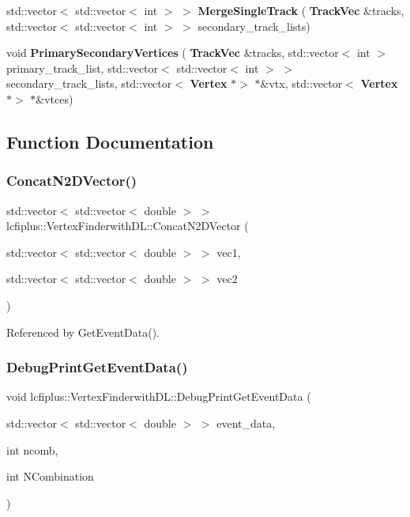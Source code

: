 \begin{DoxyCompactItemize}
\item 
std\+::vector$<$ std\+::vector$<$ int $>$ $>$ \textbf{ Merge\+Single\+Track} (\textbf{ Track\+Vec} \&tracks, std\+::vector$<$ std\+::vector$<$ int $>$ $>$ secondary\+\_\+track\+\_\+lists)
\item 
void \textbf{ Primary\+Secondary\+Vertices} (\textbf{ Track\+Vec} \&tracks, std\+::vector$<$ int $>$ primary\+\_\+track\+\_\+list, std\+::vector$<$ std\+::vector$<$ int $>$ $>$ secondary\+\_\+track\+\_\+lists, std\+::vector$<$ \textbf{ Vertex} $\ast$$>$ $\ast$\&vtx, std\+::vector$<$ \textbf{ Vertex} $\ast$$>$ $\ast$\&vtces)
\end{DoxyCompactItemize}


\subsection{Function Documentation}
\mbox{\label{namespacelcfiplus_1_1VertexFinderwithDL_a25ff5f93f960ee69e080216f132c5e1c}} 
\subsubsection{Concat\+N2\+D\+Vector()}
{\footnotesize\ttfamily std\+::vector$<$ std\+::vector$<$ double $>$ $>$ lcfiplus\+::\+Vertex\+Finderwith\+D\+L\+::\+Concat\+N2\+D\+Vector (\begin{DoxyParamCaption}\item[{std\+::vector$<$ std\+::vector$<$ double $>$ $>$}]{vec1,  }\item[{std\+::vector$<$ std\+::vector$<$ double $>$ $>$}]{vec2 }\end{DoxyParamCaption})}



Referenced by Get\+Event\+Data().

\mbox{\label{namespacelcfiplus_1_1VertexFinderwithDL_a172281350ea443c9eb5b63ac949cec10}} 
\subsubsection{Debug\+Print\+Get\+Event\+Data()}
{\footnotesize\ttfamily void lcfiplus\+::\+Vertex\+Finderwith\+D\+L\+::\+Debug\+Print\+Get\+Event\+Data (\begin{DoxyParamCaption}\item[{std\+::vector$<$ std\+::vector$<$ double $>$ $>$}]{event\+\_\+data,  }\item[{int}]{ncomb,  }\item[{int}]{N\+Combination }\end{DoxyParamCaption})}

